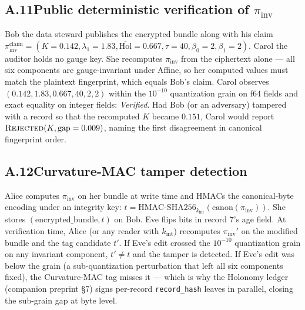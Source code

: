 \documentclass[11pt,letterpaper]{article}
\begin{document}
\subsection*{A.11\quad Public deterministic verification of $\pi_{\mathrm{inv}}$}
Bob the data steward publishes the encrypted bundle along with
his claim $\pi_{\mathrm{inv}}^{\text{claim}} = (K = 0.142,
\lambda_1 = 1.83, \overline{\mathrm{Hol}} = 0.667, \tau = 40,
\beta_0 = 2, \beta_1 = 2)$. Carol the auditor holds no gauge
key. She recomputes $\pi_{\mathrm{inv}}$ from the ciphertext
alone --- all six components are gauge-invariant under Affine,
so her computed values must match the plaintext fingerprint,
which equals Bob's claim. Carol observes $(0.142, 1.83, 0.667,
40, 2, 2)$ within the $10^{-10}$ quantization grain on f64
fields and exact equality on integer fields: \emph{Verified}.
Had Bob (or an adversary) tampered with a record so that the
recomputed $K$ became $0.151$, Carol would report
$\textsc{Rejected}(K, \mathrm{gap} = 0.009)$, naming the first
disagreement in canonical fingerprint order.

\subsection*{A.12\quad Curvature-MAC tamper detection}
Alice computes $\pi_{\mathrm{inv}}$ on her bundle at write time
and HMACs the canonical-byte encoding under an integrity key:
$t = \mathrm{HMAC\text{-}SHA256}_{k_{\text{int}}}
(\mathrm{canon}(\pi_{\mathrm{inv}}))$. She stores
$(\text{encrypted\_bundle}, t)$ on Bob. Eve flips bits in record
$7$'s age field. At verification time, Alice (or any reader with
$k_{\text{int}}$) recomputes $\pi_{\mathrm{inv}}'$ on the
modified bundle and the tag candidate $t'$. If Eve's edit
crossed the $10^{-10}$ quantization grain on any invariant
component, $t' \neq t$ and the tamper is detected. If Eve's edit
was below the grain (a sub-quantization perturbation that left
all six components fixed), the Curvature-MAC tag misses it ---
which is why the Holonomy ledger (companion preprint \S 7) signs
per-record \texttt{record\_hash} leaves in parallel, closing the
sub-grain gap at byte level.
\end{document}
